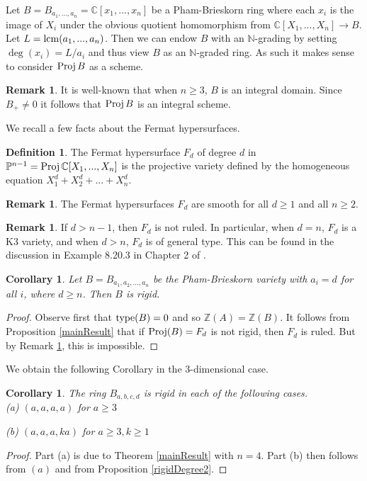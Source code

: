 \documentclass[12pt]{amsart}
\theoremstyle{plain}
\newtheorem{corollary}[subsection]{Corollary}
\theoremstyle{definition}
\newtheorem{definition}[subsection]{Definition}
\newtheorem{remark}[subsection]{Remark}
\newcommand{\Proj}{		\operatorname{{\rm Proj}}}
\newcommand{\lcm}{		\operatorname{{\rm lcm}}}
\newcommand{\type}{		\operatorname{{\rm type}}}
\newcommand{\Integ}{\ensuremath{\mathbb{Z}}}
\newcommand{\Nat}{\ensuremath{\mathbb{N}}}
\newcommand{\Comp}{\ensuremath{\mathbb{C}}}
\newcommand{\proj}{\ensuremath{\mathbb{P}}}
\begin{document}
Let $B = B_{a_1, ..., a_n} = \Comp[x_1, ..., x_n]$ be a Pham-Brieskorn ring where each $x_i$ is the image of $X_i$ under the obvious quotient homomorphism from $\Comp[X_1,...,X_n] \to B$. Let $L = \lcm(a_1, ..., a_n)$. Then we can endow $B$ with an $\Nat$-grading by setting $\deg(x_i) = L/a_i$ and thus view $B$ as an $\Nat$-graded ring. As such it makes sense to consider $\Proj B$ as a scheme. 

\begin{remark} It is well-known that when $n \geq 3$, $B$ is an integral domain. Since $B_+ \neq 0$ it follows that $\Proj B$ is an integral scheme.
\end{remark}

We recall a few facts about the Fermat hypersurfaces. 

\begin{definition} The Fermat hypersurface $F_d$ of degree $d$ in $\proj^{n-1} = \Proj \Comp[X_1, ..., X_n]$ is the projective variety defined by the homogeneous equation $X_1^d + X_2^d + ... + X_n^d$.  
\end{definition}

\begin{remark} The Fermat hypersurfaces $F_d$ are smooth for all $d \geq 1$ and all $n \geq 2$. 
\end{remark}
\begin{remark} \label{notRuled}
	If $d > n-1$, then $F_d$ is not ruled. In particular, when $d=n$, $F_d$ is a K3 variety, and when $d > n$, $F_d$ is of general type. This can be found in the discussion in Example 8.20.3 in Chapter 2 of \cite{Hartshorne}. 
\end{remark}	

\begin{corollary} Let $B = B_{a_1,a_2,...,a_n}$ be the Pham-Brieskorn variety with $a_i = d$ for all $i$, where $d \geq n$. Then $B$ is rigid. 
\end{corollary}

\begin{proof} Observe first that $\type(B) = 0$ and so $\Integ(A) = \Integ(B)$. It follows from Proposition \ref{mainResult} that if $\Proj(B) = F_d$ is not rigid, then $F_d$ is ruled. But by Remark \ref{notRuled}, this is impossible. 
\end{proof}

We obtain the following Corollary in the 3-dimensional case. 

\begin{corollary}
	The ring $B_{a,b,c,d}$ is rigid in each of the following cases.
	\\
	
	(a) $(a,a,a,a)$ for $a \geq 3$
	
	(b) $(a,a,a,ka)$ for $a \geq 3, k \geq 1$
\end{corollary}
\begin{proof}
	Part (a) is due to Theorem \ref{mainResult} with $n = 4$. Part (b) then follows from $(a)$ and from Proposition \ref{rigidDegree2}. 
\end{proof}
\end{document}
